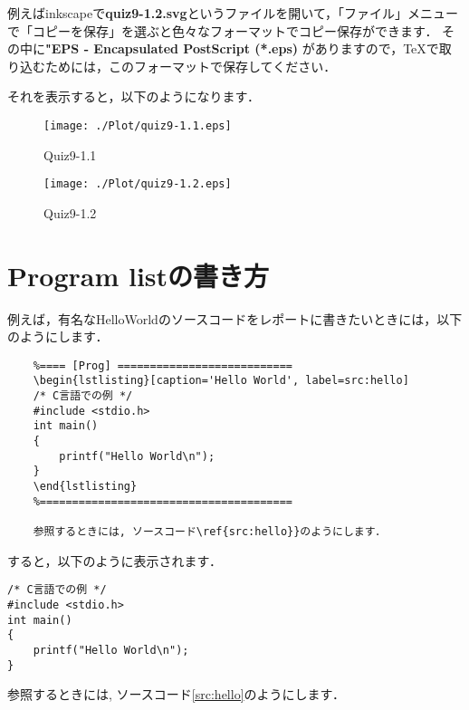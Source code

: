 \documentclass[12pt,a4j,dvipdfmx]{jarticle}
\begin{document}
例えばinkscapeで{\bf quiz9-1.2.svg}というファイルを開いて，「ファイル」メニューで「コピーを保存」を選ぶと色々なフォーマットでコピー保存ができます．
その中に{\bf "EPS - Encapsulated PostScript (*.eps)} がありますので，\TeX で取り込むためには，このフォーマットで保存してください．

それを表示すると，以下のようになります．

\begin{figure}[htb]
\begin{minipage}{0.5\hsize}
    \begin{center}
    \texttt{[image: ./Plot/quiz9-1.1.eps]} 
    \caption{Quiz9-1.1}                        
    \end{center}
\end{minipage}
\begin{minipage}{0.5\hsize}
    \begin{center}
    \texttt{[image: ./Plot/quiz9-1.2.eps]} 
    \caption{Quiz9-1.2}                        
    \end{center}
\end{minipage}
\end{figure}

\newpage
\section{Program listの書き方}

例えば，有名なHelloWorldのソースコードをレポートに書きたいときには，以下のようにします．
\begin{shadebox}
{\small
\begin{verbatim}
    %==== [Prog] ===========================
    \begin{lstlisting}[caption='Hello World', label=src:hello]
    /* C言語での例 */
    #include <stdio.h>
    int main()
    {
        printf("Hello World\n");
    }
    \end{lstlisting}
    %=======================================

    参照するときには, ソースコード\ref{src:hello}}のようにします．
\end{verbatim}
}
\end{shadebox}

すると，以下のように表示されます．

\begin{shadebox}
\begin{lstlisting}[caption='Hello World', label=src:hello]
/* C言語での例 */
#include <stdio.h>
int main()
{
    printf("Hello World\n");
}
\end{lstlisting}
    参照するときには, ソースコード\ref{src:hello}のようにします．
\end{shadebox}


\end{document}
